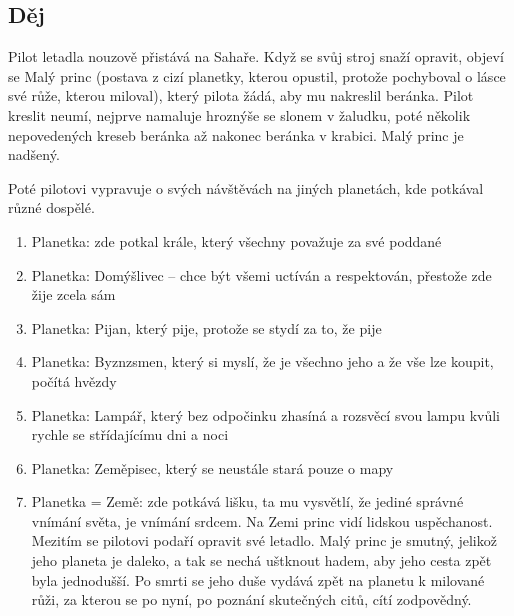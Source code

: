 \subsection*{Děj}
Pilot letadla nouzově přistává na Sahaře.
Když se svůj stroj snaží opravit, objeví se Malý princ (postava z cizí planetky, kterou opustil, protože pochyboval o lásce své růže, kterou miloval), který pilota žádá, aby mu nakreslil beránka.
Pilot kreslit neumí, nejprve namaluje hroznýše se slonem v žaludku, poté několik nepovedených kreseb beránka až nakonec beránka v krabici.
Malý princ je nadšený.

Poté pilotovi vypravuje o svých návštěvách na jiných planetách, kde potkával různé dospělé.
\begin{enumerate}
  \itemsep-0.5em
  \item Planetka: zde potkal krále, který všechny považuje za své poddané
  \item Planetka: Domýšlivec – chce být všemi uctíván a respektován, přestože zde žije zcela sám
  \item Planetka: Pijan, který pije, protože se stydí za to, že pije
  \item Planetka: Byznzsmen, který si myslí, že je všechno jeho a že vše lze koupit, počítá hvězdy
  \item Planetka: Lampář, který bez odpočinku zhasíná a rozsvěcí svou lampu kvůli rychle se střídajícímu dni a noci
  \item Planetka: Zeměpisec, který se neustále stará pouze o mapy
  \item Planetka = Země: zde potkává lišku, ta mu vysvětlí, že jediné správné vnímání světa, je vnímání srdcem.
        Na Zemi princ vidí lidskou uspěchanost.
        Mezitím se pilotovi podaří opravit své letadlo.
        Malý princ je smutný, jelikož jeho planeta je daleko, a tak se nechá uštknout hadem, aby jeho cesta zpět byla jednodušší.
        Po smrti se jeho duše vydává zpět na planetu k milované růži, za kterou se po nyní, po poznání skutečných citů, cítí zodpovědný.
\end{enumerate}

